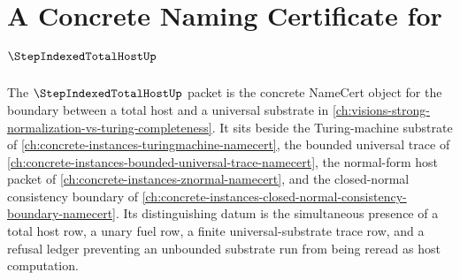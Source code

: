\chapter{A Concrete Naming Certificate for $\StepIndexedTotalHostUp$}
\label{ch:concrete-instances-step-indexed-total-host-namecert}

The $\StepIndexedTotalHostUp$ packet is the concrete NameCert object for the boundary between a total host and a universal substrate in \autoref{ch:visions-strong-normalization-vs-turing-completeness}. It sits beside the Turing-machine substrate of \autoref{ch:concrete-instances-turingmachine-namecert}, the bounded universal trace of \autoref{ch:concrete-instances-bounded-universal-trace-namecert}, the normal-form host packet of \autoref{ch:concrete-instances-znormal-namecert}, and the closed-normal consistency boundary of \autoref{ch:concrete-instances-closed-normal-consistency-boundary-namecert}. Its distinguishing datum is the simultaneous presence of a total host row, a unary fuel row, a finite universal-substrate trace row, and a refusal ledger preventing an unbounded substrate run from being reread as host computation.



